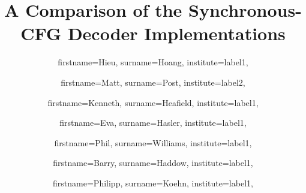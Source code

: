 \documentclass{pbml}
\begin{document}

\title{A Comparison of the Synchronous-CFG \titlelinebreak{} Decoder Implementations}




\author{
  firstname=Hieu,
  surname=Hoang,
  institute=label1,
}
\author{
  firstname=Matt,
  surname=Post,
  institute=label2,
}
\author{
  firstname=Kenneth,
  surname=Heafield,
  institute=label1,
}
\author{
  firstname=Eva,
  surname=Hasler,
  institute=label1,
}
\author{
  firstname=Phil,
  surname=Williams,
  institute=label1,
}
\author{
  firstname=Barry,
  surname=Haddow,
  institute=label1,
}
\author{
  firstname=Philipp,
  surname=Koehn,
  institute=label1,
}

\end{document}
